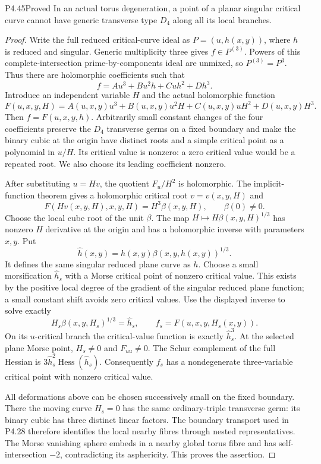 \begin{statement}{P4.45}{Proved}
In an actual torus degeneration, a point of a planar
singular critical curve cannot have generic transverse
type $D_4$ along all its local branches.
\end{statement}
\begin{proof}
Write the full reduced critical-curve ideal as
$P=(u,h(x,y))$, where $h$ is reduced and singular.
Generic multiplicity three gives $f\in P^{(3)}$.
Powers of this complete-intersection prime-by-components
ideal are unmixed, so $P^{(3)}=P^3$. Thus there are
holomorphic coefficients such that
\[
 f=A u^3+B u^2h+Cuh^2+Dh^3.
\]
Introduce an independent variable $H$ and the actual
holomorphic function
\[
 F(u,x,y,H)=A(u,x,y)u^3+B(u,x,y)u^2H
               +C(u,x,y)uH^2+D(u,x,y)H^3.
\]
Then $f=F(u,x,y,h)$. Arbitrarily small constant changes
of the four coefficients preserve the $D_4$ transverse
germs on a fixed boundary and make the binary cubic
at the origin have distinct roots and a simple critical
point as a polynomial in $u/H$. Its critical value is
nonzero: a zero critical value would be a repeated root.
We also choose its leading coefficient nonzero.

After substituting $u=Hv$, the quotient $F_u/H^2$
is holomorphic. The implicit-function theorem gives
a holomorphic critical root $v=v(x,y,H)$ and
\[
          F(Hv(x,y,H),x,y,H)=H^3\beta(x,y,H),
                       \qquad \beta(0)\ne0.
\]
Choose the local cube root of the unit $\beta$.
The map $H\mapsto H\beta(x,y,H)^{1/3}$ has nonzero
$H$ derivative at the origin and has a holomorphic
inverse with parameters $x,y$. Put
\[
             \widehat h(x,y)=h(x,y)
                           \beta(x,y,h(x,y))^{1/3}.
\]
It defines the same singular reduced plane curve as $h$.
Choose a small morsification $\widehat h_s$ with a
Morse critical point of nonzero critical value. This
exists by the positive local degree of the gradient
of the singular reduced plane function; a small constant
shift avoids zero critical values. Use the displayed
inverse to solve exactly
\[
         H_s\beta(x,y,H_s)^{1/3}=\widehat h_s,
             \qquad f_s=F(u,x,y,H_s(x,y)).
\]
On its $u$-critical branch the critical-value function
is exactly $\widehat h_s^3$. At the selected plane
Morse point, $H_s\ne0$ and $F_{uu}\ne0$. The Schur
complement of the full Hessian is
$3\widehat h_s^2\operatorname{Hess}(\widehat h_s)$.
Consequently $f_s$ has a nondegenerate three-variable
critical point with nonzero critical value.

All deformations above can be chosen successively small
on the fixed boundary. There the moving curve $H_s=0$
has the same ordinary-triple transverse germ: its binary
cubic has three distinct linear factors. The boundary
transport used in P4.28 therefore identifies the local
nearby fibres through nested representatives. The Morse
vanishing sphere embeds in a nearby global torus fibre
and has self-intersection $-2$, contradicting its
asphericity. This proves the assertion.
\end{proof}

